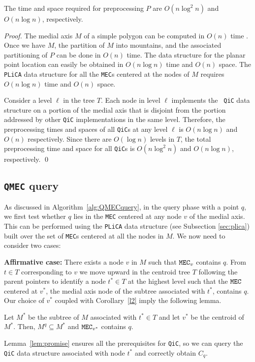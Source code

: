 \documentclass[12pt]{llncs}
\begin{document}
\begin{lemma} \label{sv}
The time and space required for preprocessing $P$ 
are $O(n\log^2 n)$ and $O(n\log n)$, 
respectively.
\end{lemma}
\begin{proof}
The medial axis $M$ of a simple polygon can  be computed in $O(n)$ time 
\cite{CSW99}. Once we have $M$, the partition of $M$ into mountains, and the 
associated 
partitioning of
$P$  can be done in $O(n)$ time. 
The data structure for the planar point location can easily be obtained in $O(n\log n)$ 
time 
and $O(n)$ space. The {\tt PLiCA} 
data structure for all the {\tt MEC}s centered at the nodes of $M$ requires $O(n\log n)
$ 
time and $O(n)$ space. 

Consider a level $\ell$ in the tree $T$. Each node in level $\ell$ implements the {\tt 
QiC} data structure on a  portion of the medial axis that is disjoint from the portion 
addressed by other {\tt QiC} implementations in the same level. Therefore,  the 
preprocessing times and spaces of all {\tt QiC}s at any level $\ell$ is $O(n \log n)$ 
and $O(n)$ respectively. Since there are $O(\log n)$ levels in $T$, the total 
preprocessing time and space for all {\tt QiC}s is $O(n \log^2 n)$ and $O(n \log n)$, 
respectively.
\qed
\end{proof}

\vspace{-0.2in}
\subsection{{\tt QMEC} query}
As discussed in Algorithm\ \ref{alg:QMECquery}, in the query phase with a point $q$, 
we first test whether $q$ lies in the {\tt MEC} centered at any node $v$ of 
the medial axis. This can be performed using the {\tt PLiCA} data structure 
(see Subsection \ref{sec:plica}) built over the set of {\tt MEC}s centered 
at all the nodes in $M$. We now need to consider two cases:

{\bf Affirmative case:} There exists a node $v$ in $M$ such that ${\tt MEC}_v$ 
contains $q$. From $t \in T$ corresponding to $v$ we move upward in the centroid  
tree $T$ following the parent 
pointers to identify a node $t^* \in T$ at the highest level such that the ${\tt MEC}$ 
centered at ${v^*}$, 
the medial axis node of the subtree associated with $t^*$, 
contains $q$. Our choice of $v^*$ coupled with Corollary\ \ref{l2} imply the following 
lemma.
\begin{lemma}\label{lem:promise}
Let $M^*$ be the subtree of $M$ associated with $t^* \in T$ and let $v^*$ be the 
centroid of $M^*$. 
Then, $M^q \subseteq M^*$ and ${\tt MEC}_{v^*}$ contains $q$.
\end{lemma}
Lemma\ \ref{lem:promise}  ensures all the prerequisites for {\tt QiC}, so we can query 
the {\tt QiC} data structure associated with  node $t^*$ and correctly obtain $C_q$.
\end{document}
